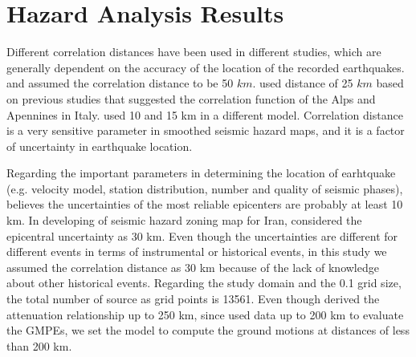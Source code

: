 \section{Hazard Analysis Results}




Different correlation distances have been used in different studies, which are generally dependent on the accuracy of the location of the recorded earthquakes. \citet{Frankel1995} and \citet{Boyd2008} assumed the correlation distance to be 50 $km$. \citet{Barani2007} used distance of 25 $km$ based on previous studies that suggested the correlation function of the Alps and Apennines in Italy. \citet{Foteva2006} used 10 and 15 km in a different model. Correlation distance is a very sensitive parameter in smoothed seismic hazard maps, and it is a factor of uncertainty in earthquake location.

Regarding the important parameters in determining the location of earhtquake (e.g. velocity model, station distribution, number and quality of seismic phases),\citet{Mirzaei1997} believes the uncertainties of the most reliable epicenters are probably at least 10 km. In developing of seismic hazard zoning map for Iran,\citet{Zare2012} considered the epicentral uncertainty as 30 km. Even though the uncertainties are different for different events in terms of instrumental or historical events, in this study we assumed the correlation distance as 30 km because of the lack of knowledge about other historical events. Regarding the study domain and the 0.1 grid size, the total number of source as grid points is 13561. Even though \citet{Kalkan2004} derived the attenuation relationship up to 250 km, since \citet{Zafarani2014} used data up to 200 km to evaluate the GMPEs, we set the model to compute the ground motions at distances of less than 200 km.


